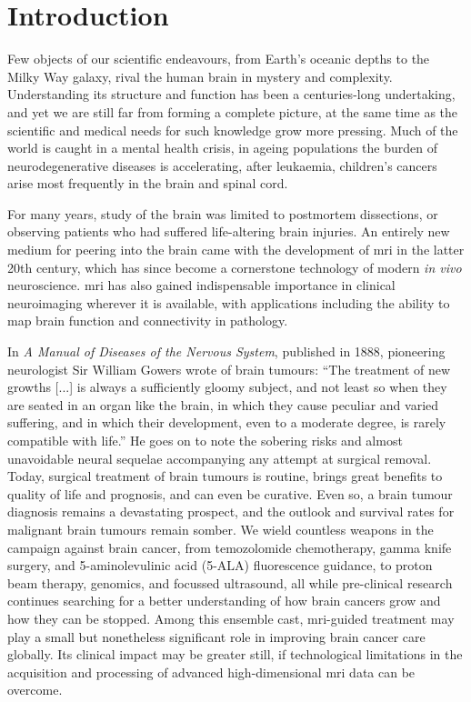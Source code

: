\chapter*{Introduction}
\label{chapterlabel0}

Few objects of our scientific endeavours, from Earth's oceanic depths to the Milky Way galaxy, rival the human brain in mystery and complexity.
Understanding its structure and function has been a centuries-long undertaking, and yet we are still far from forming a complete picture, at the same time as the scientific and medical needs for such knowledge grow more pressing.
Much of the world is caught in a mental health crisis\autocite{Patel2018,Liu2020,Yang2021a}, in ageing populations the burden of neurodegenerative diseases is accelerating\autocite{Deuschl2020,Li2022}, after leukaemia, children's cancers arise most frequently in the brain and spinal cord\autocite{Ostrom2015}.

For many years, study of the brain was limited to postmortem dissections, or observing patients who had suffered life-altering brain injuries.
An entirely new medium for peering into the brain came with the development of \gls{mri} in the latter 20th century, which has since become a cornerstone technology of modern \textit{in vivo} neuroscience.
\Gls{mri} has also gained indispensable importance in clinical neuroimaging wherever it is available\autocite{Geethanath2019}, with applications including the ability to map brain function and connectivity in pathology.

In \textit{A Manual of Diseases of the Nervous System}, published in 1888, pioneering neurologist Sir William Gowers wrote of brain tumours:
``The treatment of new growths [...] is always a sufficiently gloomy subject, and not least so when they are seated in an organ like the brain, in which they cause peculiar and varied suffering, and in which their development, even to a moderate degree, is rarely compatible with life.''\autocite{Gowers1888}
He goes on to note the sobering risks and almost unavoidable neural sequelae accompanying any attempt at surgical removal.
Today, surgical treatment of brain tumours is routine, brings great benefits to quality of life and prognosis, and can even be curative.
Even so, a brain tumour diagnosis remains a devastating prospect, and the outlook and survival rates for malignant brain tumours remain somber\autocite{Aldape2019}.
We wield countless weapons in the campaign against brain cancer, from temozolomide chemotherapy, gamma knife surgery, and 5-aminolevulinic acid (5-ALA) fluorescence guidance, to proton beam therapy, genomics, and focussed ultrasound, all while pre-clinical research continues searching for a better understanding of how brain cancers grow and how they can be stopped.
Among this ensemble cast, \gls{mri}-guided treatment may play a small but nonetheless significant role in improving brain cancer care globally.
Its clinical impact may be greater still, if technological limitations in the acquisition and processing of advanced high-dimensional \gls{mri} data can be overcome.

